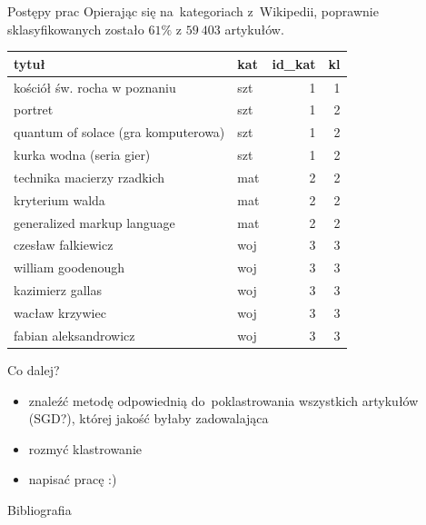 \documentclass[11pt,pdftex,mathserif]{beamer}\usepackage[]{graphicx}\usepackage[]{color}
\theoremstyle{definition}
\begin{document}
\begin{frame}{Postępy prac}
Opierając się na~kategoriach z~Wikipedii, poprawnie sklasyfikowanych zostało $61\%$ z $59\ 403$ artykułów.
\begin{tabular}{|l|l|r|r|}
  \hline
tytuł & kat & id\_kat & kl \\ 
  \hline
kościół św. rocha w poznaniu & szt & 1 & 1 \\ 
  portret & szt & 1 & 2 \\ 
  quantum of solace (gra komputerowa) & szt & 1 & 2 \\ 
  kurka wodna (seria gier) & szt & 1 & 2 \\ 
  technika macierzy rzadkich & mat & 2 & 2 \\ 
  kryterium walda & mat & 2 & 2 \\ 
  generalized markup language & mat & 2 & 2 \\ 
  czesław falkiewicz & woj & 3 & 3 \\ 
  william goodenough & woj & 3 & 3 \\ 
  kazimierz gallas & woj & 3 & 3 \\ 
  wacław krzywiec & woj & 3 & 3 \\ 
  fabian aleksandrowicz & woj & 3 & 3 \\ 
   \hline
\end{tabular}

% 
% 
\end{frame}


\begin{frame}{Co dalej?}
\begin{itemize}
\item znaleźć metodę odpowiednią do~poklastrowania wszystkich artykułów (SGD?), której jakość byłaby zadowalająca
\item rozmyć klastrowanie
\item napisać pracę :)
\end{itemize}
\end{frame}

\begin{frame}{Bibliografia}
\nocite{Hornik2012:sphkmeans}
\nocite{Wild2002:sphkmeans}
\nocite{Loo2014:stringdist}


\end{frame}
\end{document}
